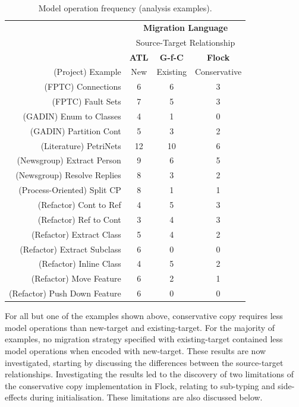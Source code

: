 \begin{table}
	\centering
	\begin{tabular}{|r|c|c|c|}
		\hline
		                              & \multicolumn{3}{|c|}{\textbf{Migration Language}} \\
													  			& \multicolumn{3}{|c|}{Source-Target Relationship} \\
		\hline
		                              & \textbf{ATL} & \textbf{G-f-C} & \textbf{Flock} \\
		(Project) Example             & New & Existing & Conservative \\
		\hline
		\hline
		(FPTC) Connections            & 6  & 6   & 3  \\
		\hline
		(FPTC) Fault Sets             & 7  & 5   & 3  \\
		\hline
		(GADIN) Enum to Classes       & 4  & 1   & 0  \\
		\hline
		(GADIN) Partition Cont        & 5  & 3   & 2  \\
		\hline
		(Literature) PetriNets        & 12  & 10   & 6  \\
		\hline
		(Newsgroup) Extract Person    & 9  & 6   & 5  \\
		\hline
		(Newsgroup) Resolve Replies   & 8  & 3   & 2  \\
		\hline
		(Process-Oriented) Split CP   & 8  & 1   & 1  \\
		\hline
		(Refactor) Cont to Ref        & 4  & 5   & 3  \\
		\hline
		(Refactor) Ref to Cont        & 3  & 4   & 3  \\
		\hline
		(Refactor) Extract Class      & 5  & 4   & 2  \\
		\hline
		(Refactor) Extract Subclass   & 6  & 0   & 0  \\
		\hline
		(Refactor) Inline Class       & 4  & 5   & 2  \\
		\hline
		(Refactor) Move Feature       & 6  & 2   & 1  \\
		\hline
		(Refactor) Push Down Feature  & 6  & 0 & 0  \\
		\hline
	\end{tabular}
	\label{tab:model_operations_results_analysis_examples}
	\caption{Model operation frequency (analysis examples).}
\end{table}

For all but one of the examples shown above, conservative copy requires less model operations than new-target and existing-target. For the majority of examples, no migration strategy specified with existing-target contained less model operations when encoded with new-target. These results are now investigated, starting by discussing the differences between the source-target relationships. Investigating the results led to the discovery of two limitations of the conservative copy implementation in Flock, relating to sub-typing and side-effects during initialisation. These limitations are also discussed below.


